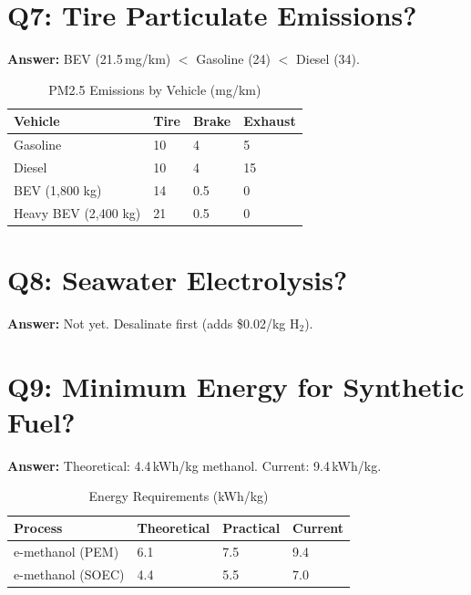 \documentclass[12pt,twoside,openany]{book}
\newcommand{\tighttabular}{\small\setlength{\tabcolsep}{3.5pt}}
\begin{document}
\section{Q7: Tire Particulate Emissions?}

\textbf{Answer:} BEV (21.5\,mg/km) $<$ Gasoline (24) $<$ Diesel (34).

\begin{table}[htbp]
    \centering
    \caption{PM2.5 Emissions by Vehicle (mg/km)}
    \label{tab:tire_pm}
    \begin{tabular}{L{4cm} C{2cm} C{2cm} C{2cm}}
    \hline
    \textbf{Vehicle} & \textbf{Tire} & \textbf{Brake} & \textbf{Exhaust} \\
    \hline
    Gasoline              & 10 & 4   & 5  \\
    Diesel                & 10 & 4   & 15 \\
    BEV (1,800 kg)        & 14 & 0.5 & 0  \\
    Heavy BEV (2,400 kg)  & 21 & 0.5 & 0  \\
    \hline
    \end{tabular}
\end{table}

\section{Q8: Seawater Electrolysis?}

\textbf{Answer:} Not yet. Desalinate first (adds \$0.02/kg H$_2$).

\section{Q9: Minimum Energy for Synthetic Fuel?}

\textbf{Answer:} Theoretical: 4.4\,kWh/kg methanol. Current: 9.4\,kWh/kg.

\begin{table}[htbp]
    \centering
    \tighttabular
    \caption{Energy Requirements (kWh/kg)}
    \label{tab:min_energy}
    \begin{tabular}{L{4cm} C{2.2cm} C{2.2cm} C{2.2cm}}
    \hline
    \textbf{Process} & \textbf{Theoretical} & \textbf{Practical} & \textbf{Current} \\
    \hline
    e-methanol (PEM)  & 6.1 & 7.5 & 9.4 \\
    e-methanol (SOEC) & 4.4 & 5.5 & 7.0 \\
    \hline
    \end{tabular}
\end{table}
\end{document}
